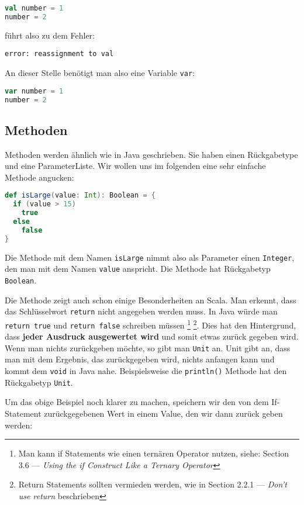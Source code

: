 \begin{lstlisting}[language=Scala,numbers=none]
val number = 1
number = 2
\end{lstlisting}

führt also zu dem Fehler:
\begin{verbatim}
error: reassignment to val
\end{verbatim}

An dieser Stelle benötigt man also eine Variable \texttt{var}:

\begin{lstlisting}[language=Scala,numbers=none]
var number = 1
number = 2
\end{lstlisting}

\subsection{Methoden}
Methoden werden ähnlich wie in Java geschrieben. Sie haben einen Rückgabetype und eine ParameterListe. Wir wollen uns im folgenden eine sehr einfache Methode angucken:

\begin{lstlisting}[language=Scala]
def isLarge(value: Int): Boolean = {
  if (value > 15)
    true
  else
    false
}
\end{lstlisting}

Die Methode mit dem Namen \texttt{isLarge} nimmt also als Parameter einen \texttt{Integer}, den man mit dem Namen \texttt{value} anspricht. Die Methode hat Rückgabetyp \texttt{Boolean}.

Die Methode zeigt auch schon einige Besonderheiten an Scala. Man erkennt, dass das Schlüsselwort \texttt{return} nicht angegeben werden muss. In Java würde man \texttt{return true} und \texttt{return false} schreiben müssen \footnote{Man kann if Statements wie einen ternären Operator nutzen, siehe: \cite{ScalaCookbook} Section 3.6 --- \textit{Using the if Construct Like a Ternary Operator}} \footnote{Return Statements sollten vermieden werden, wie in \cite{ScalaInDepth} Section 2.2.1 --- \textit{Don't use return} beschrieben}. Dies hat den Hintergrund, dass \textbf{jeder Ausdruck ausgewertet wird} und somit etwas zurück gegeben wird. Wenn man nichts zurückgeben möchte, so gibt man \texttt{Unit} an. Unit gibt an, dass man mit dem Ergebnis, das zurückgegeben wird, nichts anfangen kann und kommt dem \texttt{void} in Java nahe. Beispielsweise die \texttt{println()} Methode hat den Rückgabetyp \texttt{Unit}.

Um das obige Beispiel noch klarer zu machen, speichern wir den von dem If-Statement zurückgegebenen Wert in einem Value, den wir dann zurück geben werden:

